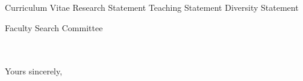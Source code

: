 



\addAttach%
{Curriculum Vitae}%
{Research Statement}%
{Teaching Statement}%
{Diversity Statement}
\def\appSpecific{with significant implications for the research fields related to Device Science and Nanotechnology}

\def\appJobID{%
    \ifthenelse{\equal{\jobID}{}}{\unskip}{\unskip\textemdash Job \# \jobID{}}%
}
\def\toAddr{%
Faculty Search Committee \\ \appDept{} \\ \appSchool{} \\ \appAddr{}%
}

\begin{letter}{\toAddr{}}
    \opening{\myOpening{}}
    
    \collabCustom{}%
    
    \closing{Yours sincerely,}
    \encl{\listAttach{}}
\end{letter}
